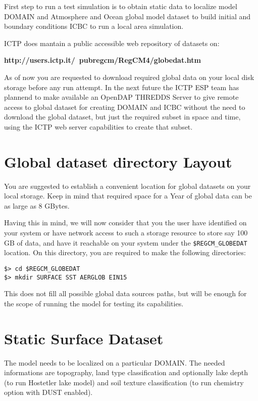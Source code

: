 %
%

First step to run a test simulation is to obtain static data to localize
model DOMAIN and Atmosphere and Ocean global model dataset to build initial
and boundary conditions ICBC to run a local area simulation.

ICTP does mantain a public accessible web repository of datasets on:

{\bf http://users.ictp.it/~pubregcm/RegCM4/globedat.htm}

As of now you are requested to download required global data on your local disk
storage before any run attempt. In the next future the ICTP ESP team has
plannend to make available an OpenDAP THREDDS Server to give remote access
to global dataset for creating DOMAIN and ICBC without the need to
download the global dataset, but just the required subset in space and time,
using the ICTP web server capabilities to create that subset.

\section{Global dataset directory Layout}

You are suggested to establish a convenient location for global datasets
on your local storage. Keep in mind that required space for a Year of global
data can be as large as 8 GBytes.

Having this in mind, we will now consider that you the user have identified
on your system or have network access to such a storage resource to store say
100 GB of data, and have it reachable on your system under the
\verb=$REGCM_GLOBEDAT= location.
On this directory, you are required to make the following directories:

\begin{Verbatim}
$> cd $REGCM_GLOBEDAT
$> mkdir SURFACE SST AERGLOB EIN15
\end{Verbatim}

This does not fill all possible global data sources paths, but will be enough
for the scope of running the model for testing its capabilities.

\section{Static Surface Dataset}

The model needs to be localized on a particular DOMAIN. The needed informations
are topography, land type classification and optionally lake depth (to run
Hostetler lake model) and soil texture classification (to run chemistry option
with DUST enabled).

